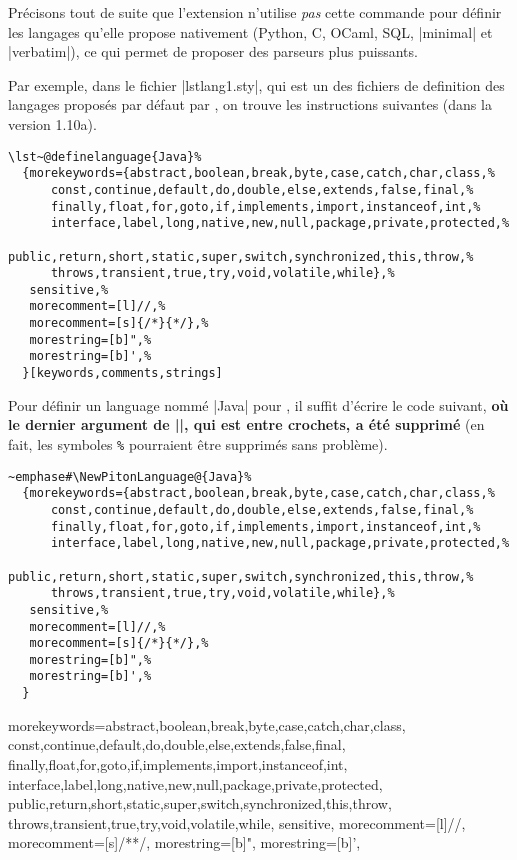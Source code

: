 \documentclass[dvipsnames,svgnames]{article}
\begin{document}
\medskip
Précisons tout de suite que l'extension  n'utilise \emph{pas} cette commande
pour définir les langages qu'elle propose nativement (Python, C, OCaml, SQL, |minimal| et
|verbatim|), ce qui permet de proposer des parseurs plus puissants. 

\medskip
Par exemple, dans le fichier |lstlang1.sty|, qui est un des fichiers de definition des
langages proposés par défaut par , on trouve les instructions suivantes
(dans la version 1.10a).

\begin{Verbatim}[formatcom=\small\color{gray}]
\lst~@definelanguage{Java}%
  {morekeywords={abstract,boolean,break,byte,case,catch,char,class,%
      const,continue,default,do,double,else,extends,false,final,%
      finally,float,for,goto,if,implements,import,instanceof,int,%
      interface,label,long,native,new,null,package,private,protected,%
      public,return,short,static,super,switch,synchronized,this,throw,%
      throws,transient,true,try,void,volatile,while},%
   sensitive,%
   morecomment=[l]//,%
   morecomment=[s]{/*}{*/},%
   morestring=[b]",%
   morestring=[b]',%
  }[keywords,comments,strings]
\end{Verbatim}

\medskip
Pour définir un language nommé |Java| pour , il suffit d'écrire le code
suivant, {\bfseries où le dernier argument de |\lst@definelanguage|, qui est entre
  crochets, a été supprimé} (en fait, les symboles \verb+%+ pourraient être supprimés sans
problème).

\begin{Verbatim}[formatcom=\small\color{gray}]
~emphase#\NewPitonLanguage@{Java}%
  {morekeywords={abstract,boolean,break,byte,case,catch,char,class,%
      const,continue,default,do,double,else,extends,false,final,%
      finally,float,for,goto,if,implements,import,instanceof,int,%
      interface,label,long,native,new,null,package,private,protected,%
      public,return,short,static,super,switch,synchronized,this,throw,%
      throws,transient,true,try,void,volatile,while},%
   sensitive,%
   morecomment=[l]//,%
   morecomment=[s]{/*}{*/},%
   morestring=[b]",%
   morestring=[b]',%
  }
\end{Verbatim}


  {morekeywords={abstract,boolean,break,byte,case,catch,char,class,
      const,continue,default,do,double,else,extends,false,final,
      finally,float,for,goto,if,implements,import,instanceof,int,
      interface,label,long,native,new,null,package,private,protected,
      public,return,short,static,super,switch,synchronized,this,throw,
      throws,transient,true,try,void,volatile,while},
   sensitive,
   morecomment=[l]//,
   morecomment=[s]{/*}{*/},
   morestring=[b]",
   morestring=[b]',
  }
\end{document}
